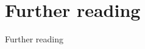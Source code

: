 \documentclass[aspectratio=169]{beamer}
\begin{document}
\section{Further reading}
\begin{frame}{Further reading}
  \nocite{*}
  \printbibliography
\end{frame}
\end{document}
